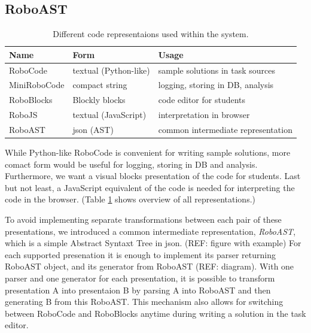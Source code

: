 \subsection{RoboAST}

\begin{table}[h]
\begin{center}
\begin{tabular}{l l l}
\toprule
Name & Form & Usage  \\
\midrule
RoboCode     & textual (Python-like) & sample solutions in task sources  \\
MiniRoboCode & compact string & logging, storing in DB, analysis  \\
RoboBlocks   & Blockly blocks & code editor for students  \\
RoboJS       & textual (JavaScript) & interpretation in browser  \\
RoboAST      & json (AST) & common intermediate representation \\
\bottomrule
\end{tabular}
\end{center}
\caption{Different code representaions used within the system.}
\label{tbl:code-representation}
\end{table}

While Python-like RoboCode is convenient for writing sample solutions,
more comact form would be useful for logging, storing in DB and analysis.
Furthermore, we want a visual blocks presentation of the code for students.
Last but not least, a JavaScript equivalent of the code is needed for
interpreting the code in the browser.
(Table \ref{tbl:code-representation} shows overview of all representations.)

To avoid implementing separate transformations between each pair of these
presentations, we introduced a common intermediate representation,
\emph{RoboAST}, which is a simple Abstract Syntaxt Tree in json.
(REF: figure with example)
For each supported presenation it is enough to implement
its parser returning RoboAST object, and
its generator from RoboAST (REF: diagram).
With one parser and one generator for each presentation,
it is possible to transform presentation A
into presentaion B by parsing A into RoboAST and
then generating B from this RoboAST.
This mechanism also allows for switching between RoboCode and RoboBlocks
anytime during writing a solution in the task editor.

